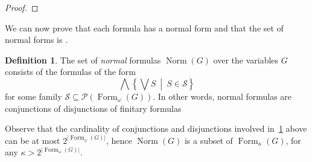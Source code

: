 \documentclass{article}
\theoremstyle{definition}
\newtheorem{defn}{Definition}
\DeclareMathOperator{\Formulas}{Form}
\DeclareMathOperator{\Norm}{Norm}
\begin{document}
\begin{proof}

\end{proof}

We can now prove that each formula has a normal form and that the set of normal forms is .
\begin{defn}\label{def:normal}
The set of \emph{normal} formulas $\Norm(G)$ over the variables $G$ consists of the formulas of the form
$$\bigwedge \left\{\bigvee S\ \middle\vert\ S \in \mathscr{S} \right\}$$
for some family $\mathscr{S} \subseteq \mathcal{P}(\Formulas_\omega(G))$. %
In other words, normal formulas are conjunctions of disjunctions of finitary formulas
\end{defn}
Observe that the cardinality of conjunctions and disjunctions involved in~\cref{def:normal} above can be at most $2^{|\Formulas_\omega(G)|}$, hence $\Norm(G)$ is a subset of $\Formulas_\kappa(G)$, for any $\kappa > 2^{|\Formulas_\omega(G)|}$.
\end{document}
